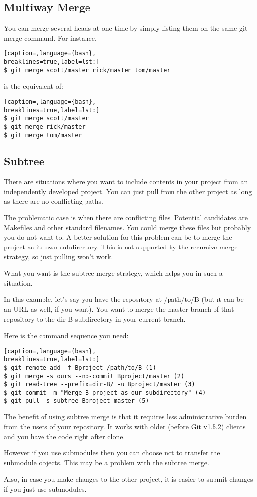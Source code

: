 \subsection{Multiway Merge}
You can merge several heads at one time by simply listing them on the same git
merge command. For instance,
\lstset{basicstyle=\scriptsize, numbers=none, captionpos=b, tabsize=4}
\begin{lstlisting}[caption=,language={bash},
breaklines=true,label=lst:]
$ git merge scott/master rick/master tom/master
\end{lstlisting}

is the equivalent of:
\lstset{basicstyle=\scriptsize, numbers=none, captionpos=b, tabsize=4}
\begin{lstlisting}[caption=,language={bash},
breaklines=true,label=lst:]
$ git merge scott/master
$ git merge rick/master
$ git merge tom/master
\end{lstlisting}

\subsection{Subtree}
There are situations where you want to include contents in your project from an
independently developed project. You can just pull from the other project as
long as there are no conflicting paths.

The problematic case is when there are conflicting files. Potential candidates
are Makefiles and other standard filenames. You could merge these files but
probably you do not want to. A better solution for this problem can be to merge
the project as its own subdirectory. This is not supported by the recursive
merge strategy, so just pulling won't work.

What you want is the subtree merge strategy, which helps you in such a
situation.

In this example, let's say you have the repository at /path/to/B (but it can be
an URL as well, if you want). You want to merge the master branch of that
repository to the dir-B subdirectory in your current branch.

Here is the command sequence you need:
\lstset{basicstyle=\scriptsize, numbers=none, captionpos=b, tabsize=4}
\begin{lstlisting}[caption=,language={bash},
breaklines=true,label=lst:]
$ git remote add -f Bproject /path/to/B (1)
$ git merge -s ours --no-commit Bproject/master (2)
$ git read-tree --prefix=dir-B/ -u Bproject/master (3)
$ git commit -m "Merge B project as our subdirectory" (4)
$ git pull -s subtree Bproject master (5)
\end{lstlisting}

The benefit of using subtree merge is that it requires less administrative
burden from the users of your repository. It works with older (before Git
v1.5.2) clients and you have the code right after clone.

However if you use submodules then you can choose not to transfer the submodule
objects. This may be a problem with the subtree merge.

Also, in case you make changes to the other project, it is easier to submit
changes if you just use submodules.
